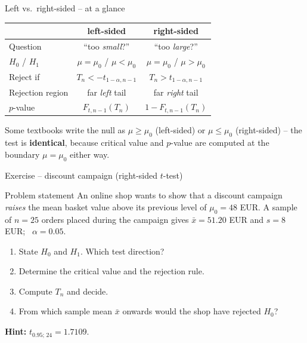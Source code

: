 \documentclass[aspectratio=169,11pt]{beamer}
\begin{document}
\begin{frame}{Left vs.\ right-sided -- at a glance}
  \begin{center}
    \renewcommand{\arraystretch}{1.3}
    \begin{tabular}{>{\raggedright\arraybackslash}p{3.0cm}cc}
      \toprule
       & \textbf{left-sided} & \textbf{right-sided}\\
      \midrule
      Question        & ``too \emph{small}?''      & ``too \emph{large}?''\\
      $H_0$ / $H_1$    & $\mu=\mu_0$ / $\mu<\mu_0$ & $\mu=\mu_0$ / $\mu>\mu_0$\\
      Reject if        & $T_n<-t_{1-\alpha,n-1}$    & $T_n>t_{1-\alpha,n-1}$\\
      Rejection region & far \emph{left} tail       & far \emph{right} tail\\
      $p$-value        & $F_{t,n-1}(T_n)$           & $1-F_{t,n-1}(T_n)$\\
      \bottomrule
    \end{tabular}
  \end{center}
  \footnotesize Some textbooks write the null as $\mu\ge\mu_0$ (left-sided) or
  $\mu\le\mu_0$ (right-sided) -- the test is \textbf{identical}, because critical value and
  $p$-value are computed at the boundary $\mu=\mu_0$ either way.
\end{frame}

\begin{frame}{Exercise -- discount campaign (right-sided $t$-test)}
  \begin{block}{Problem statement}
    An online shop wants to show that a discount campaign \emph{raises} the
    mean basket value above its previous level of $\mu_0=48$ EUR. A sample of
    $n=25$ orders placed during the campaign gives $\bar x=51.20$ EUR and
    $s=8$ EUR; \ $\alpha=0.05$.
  \end{block}
  \begin{enumerate}\setlength{\itemsep}{3pt}
    \item[a)] State $H_0$ and $H_1$. Which test direction?
    \item[b)] Determine the critical value and the rejection rule.
    \item[c)] Compute $T_n$ and decide.
    \item[d)] From which sample mean $\bar x$ onwards would the shop have
              rejected $H_0$?
  \end{enumerate}
  \textbf{Hint:} $t_{0.95;\,24}=1.7109$.
\end{frame}
\end{document}
